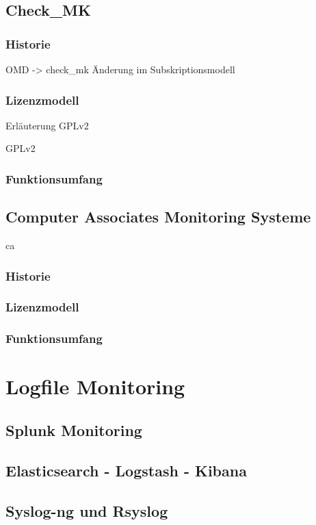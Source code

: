 \documentclass[12pt,a4paper]{report}
\begin{document}
	\subsection{Check\_MK}
	\subsubsection{Historie}
	OMD -> check\_mk Änderung im Subskriptionsmodell
	
	\subsubsection{Lizenzmodell}
	Erläuterung GPLv2
	
	\gls{GPLv2}
	\subsubsection{Funktionsumfang}
	
	\subsection{Computer Associates Monitoring Systeme}
	
	\gls{ca}
	
	\subsubsection{Historie}
	\subsubsection{Lizenzmodell}
	\subsubsection{Funktionsumfang}
	\section{Logfile Monitoring}
	\subsection{Splunk Monitoring}
	\subsection{Elasticsearch - Logstash - Kibana}
	\subsection{Syslog-ng und Rsyslog}
\end{document}

